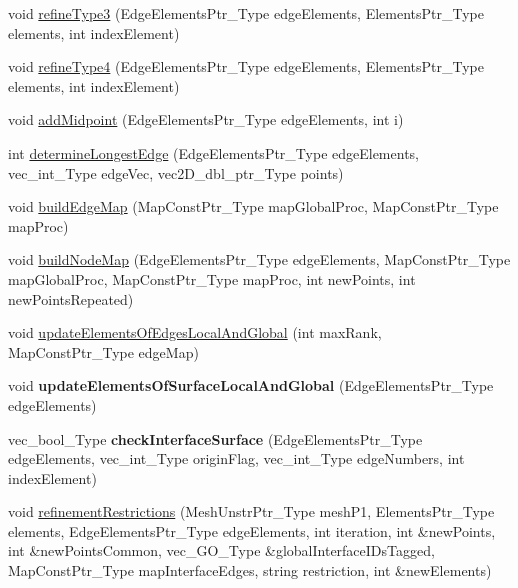 \begin{DoxyCompactItemize}
\item 
void \hyperlink{classFEDD_1_1RefinementFactory_ab7d30ce942e7f4d2ac06cace8a3c8984}{refine\+Type3} (Edge\+Elements\+Ptr\+\_\+\+Type edge\+Elements, Elements\+Ptr\+\_\+\+Type elements, int index\+Element)
\item 
void \hyperlink{classFEDD_1_1RefinementFactory_adc45634db04fda3d86f19be57d1b0ec4}{refine\+Type4} (Edge\+Elements\+Ptr\+\_\+\+Type edge\+Elements, Elements\+Ptr\+\_\+\+Type elements, int index\+Element)
\item 
void \hyperlink{classFEDD_1_1RefinementFactory_a07c49ebd314357418d93aeb8bf2ac666}{add\+Midpoint} (Edge\+Elements\+Ptr\+\_\+\+Type edge\+Elements, int i)
\item 
int \hyperlink{classFEDD_1_1RefinementFactory_ad5112e8af74f71275fe3a90669b966b3}{determine\+Longest\+Edge} (Edge\+Elements\+Ptr\+\_\+\+Type edge\+Elements, vec\+\_\+int\+\_\+\+Type edge\+Vec, vec2\+D\+\_\+dbl\+\_\+ptr\+\_\+\+Type points)
\item 
void \hyperlink{classFEDD_1_1RefinementFactory_a89cb811b8014461cf78e7579e711a8b4}{build\+Edge\+Map} (Map\+Const\+Ptr\+\_\+\+Type map\+Global\+Proc, Map\+Const\+Ptr\+\_\+\+Type map\+Proc)
\item 
void \hyperlink{classFEDD_1_1RefinementFactory_afe582bf6848a69e8cd678c4234a41cd6}{build\+Node\+Map} (Edge\+Elements\+Ptr\+\_\+\+Type edge\+Elements, Map\+Const\+Ptr\+\_\+\+Type map\+Global\+Proc, Map\+Const\+Ptr\+\_\+\+Type map\+Proc, int new\+Points, int new\+Points\+Repeated)
\item 
void \hyperlink{classFEDD_1_1RefinementFactory_aa94ef9d255a71b12409a6bfef6456aef}{update\+Elements\+Of\+Edges\+Local\+And\+Global} (int max\+Rank, Map\+Const\+Ptr\+\_\+\+Type edge\+Map)
\item 
\mbox{\label{classFEDD_1_1RefinementFactory_a82ecf13ea678ae2ba822104d85182a3f}} 
void {\bfseries update\+Elements\+Of\+Surface\+Local\+And\+Global} (Edge\+Elements\+Ptr\+\_\+\+Type edge\+Elements)
\item 
\mbox{\label{classFEDD_1_1RefinementFactory_a2dcc6cb8430ece1eaf52f560f8466d92}} 
vec\+\_\+bool\+\_\+\+Type {\bfseries check\+Interface\+Surface} (Edge\+Elements\+Ptr\+\_\+\+Type edge\+Elements, vec\+\_\+int\+\_\+\+Type origin\+Flag, vec\+\_\+int\+\_\+\+Type edge\+Numbers, int index\+Element)
\item 
void \hyperlink{classFEDD_1_1RefinementFactory_ad8bf5e8cc4819d8caf544708d63248d9}{refinement\+Restrictions} (Mesh\+Unstr\+Ptr\+\_\+\+Type mesh\+P1, Elements\+Ptr\+\_\+\+Type elements, Edge\+Elements\+Ptr\+\_\+\+Type edge\+Elements, int iteration, int \&new\+Points, int \&new\+Points\+Common, vec\+\_\+\+G\+O\+\_\+\+Type \&global\+Interface\+I\+Ds\+Tagged, Map\+Const\+Ptr\+\_\+\+Type map\+Interface\+Edges, string restriction, int \&new\+Elements)

\end{DoxyCompactItemize}
